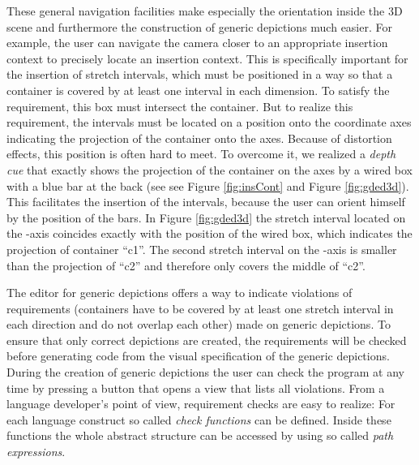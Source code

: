 \documentclass[a4paper]{article}
\begin{document}
These general navigation facilities make especially the orientation inside the 3D scene and furthermore the construction of generic depictions much easier. For example, the user can navigate the camera closer to an appropriate insertion context to precisely locate an insertion context. This is specifically important for the insertion of stretch intervals, which must be positioned in a way so that a container is covered by at least one interval in each dimension. To satisfy the requirement, this box must intersect the container. But to realize this requirement, the intervals must be located on a position onto the coordinate axes indicating the projection of the container onto the axes. Because of distortion effects, this position is often hard to meet. To overcome it, we realized a \emph{depth cue} that exactly shows the projection of the container on the axes by a wired box with a blue bar at the back (see see Figure \ref{fig:insCont} and Figure \ref{fig:gded3d}). This facilitates the insertion of the intervals, because the user can orient himself by the position of the bars. In Figure \ref{fig:gded3d} the stretch interval located on the -axis coincides exactly with the position of the wired box, which indicates the projection of container ``c1''. The second stretch interval on the -axis is smaller than the projection of ``c2'' and therefore only covers the middle of ``c2''.

The editor for generic depictions offers a way to indicate violations of requirements (containers have to be covered by at least one stretch interval in each direction and do not overlap each other) made on generic depictions. To ensure that only correct depictions are created, the requirements will be checked before generating code from the visual specification of the generic depictions. During the creation of generic depictions the user can check the program at any time by pressing a button that opens a view that lists all violations. From a language developer's point of view, requirement checks are easy to realize: For each language construct so called \emph{check functions} can be defined. Inside these functions the whole abstract structure can be accessed by using so called \emph{path expressions}.
\end{document}

